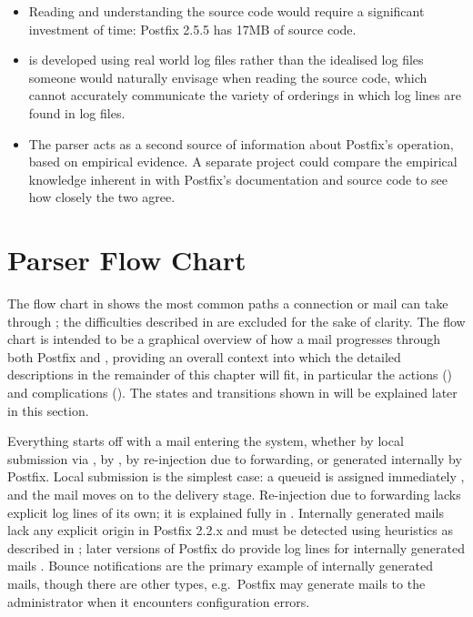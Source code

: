 \begin{itemize}

    \item Reading and understanding the source code would require a
        significant investment of time: Postfix 2.5.5 has 17MB of source
        code.

    \item \parsername{} is developed using real world log files rather than
        the idealised log files someone would naturally envisage when
        reading the source code, which cannot accurately communicate the
        variety of orderings in which log lines are found in log files.

    \item The parser acts as a second source of information about Postfix's
        operation, based on empirical evidence.  A separate project could
        compare the empirical knowledge inherent in \parsername{} with
        Postfix's documentation and source code to see how closely the two
        agree.

\end{itemize}



\section{Parser Flow Chart}

\label{flow chart}

The flow chart in  shows the most common paths
a connection or mail can take through \parsername{}; the difficulties
described in  are excluded for the sake of
clarity.  The flow chart is intended to be a graphical overview of how a
mail progresses through both Postfix and \parsername{}, providing an
overall context into which the detailed descriptions in the remainder of
this chapter will fit, in particular the actions () and complications ().  The
states and transitions shown in  will be
explained later in this section.


Everything starts off with a mail entering the system, whether by local
submission via , by , by re-injection due to
forwarding, or generated internally by Postfix.  Local submission is the
simplest case: a queueid is assigned immediately , and
the mail moves on to the delivery stage.  Re-injection due to forwarding
lacks explicit log lines of its own; it is explained fully in
.  Internally generated mails lack any
explicit origin in Postfix 2.2.x and must be detected using heuristics as
described in ; later versions
of Postfix do provide log lines for internally generated mails
.  Bounce notifications are the primary
example of internally generated mails, though there are other types, e.g.\
Postfix may generate mails to the administrator when it encounters
configuration errors.


